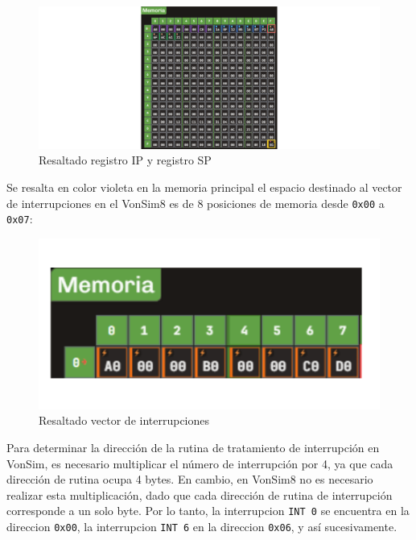 \documentclass[12pt,oneside]{templates/unerthesis}
\begin{document}
\begin{figure}

{\centering \includegraphics[width=1\linewidth]{images/resaltadoipsp} 

}

\caption{Resaltado registro IP y registro SP}\label{fig:resaltadoip}
\end{figure}

Se resalta en color violeta en la memoria principal el espacio destinado al vector de interrupciones en el VonSim8 es de 8 posiciones de memoria desde \texttt{0x00} a \texttt{0x07}:

\begin{figure}

{\centering \includegraphics[width=1\linewidth]{images/resaltadoint} 

}

\caption{Resaltado vector de interrupciones}\label{fig:resaltadointsp}
\end{figure}

Para determinar la dirección de la rutina de tratamiento de interrupción en VonSim, es necesario multiplicar el número de interrupción por 4, ya que cada dirección de rutina ocupa 4 bytes. En cambio, en VonSim8 no es necesario realizar esta multiplicación, dado que cada dirección de rutina de interrupción corresponde a un solo byte. Por lo tanto, la interrupcion \texttt{INT\ 0} se encuentra en la direccion \texttt{0x00}, la interrupcion \texttt{INT\ 6} en la direccion \texttt{0x06}, y así sucesivamente.
\end{document}
